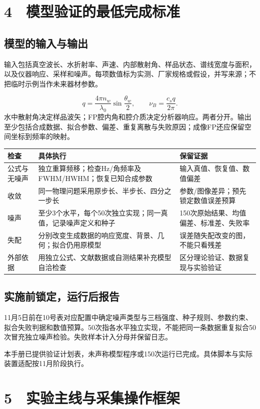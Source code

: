 \documentclass[UTF8,a4paper,11pt,fontset=fandol]{ctexart}
\begin{document}
\section*{4　模型验证的最低完成标准}
\subsection*{模型的输入与输出}
输入包括真空波长、水折射率、声速、内部散射角、样品状态、谱线宽度与面积，以及仪器响应、采样和噪声。每项数值标为实测、厂家规格或假设，并写来源；不把临时示例当作未来器材参数。

\begin{equation*}
q=\frac{4\pi n_w}{\lambda_0}\sin\frac{\theta_w}{2},\qquad
\nu_B=\frac{c_s q}{2\pi}.
\end{equation*}
水中散射角决定样品波矢；FP腔内角和腔介质决定分析器响应。两者分开。输出至少包括合成数据、拟合参数、偏差、重复离散与失败原因；成像FP还应保留空间坐标到频率的映射。

\begin{longtable}{P{2.0cm}P{7.3cm}P{4.8cm}}
\toprule
\textbf{检查} & \textbf{具体执行} & \textbf{保留证据}\\\midrule\endhead
公式与无噪声 & 独立重算频移；检查Hz/角频率及FWHM/HWHM；恢复已知合成参数 & 输入真值、恢复值、数值偏差\\[0.35em]
收敛 & 同一物理问题采用原步长、半步长、四分之一步长 & 参数/图像差异；预先锁定数值误差预算\\[0.35em]
噪声 & 至少3个水平，每个50次独立实现；同一真值，记录噪声定义和种子 & 150次原始结果、均值偏差、标准差、失败率\\[0.35em]
失配 & 分别改变生成数据的响应宽度、背景、几何；拟合仍用原模型 & 误差随失配改变的图，不能只看残差\\[0.35em]
外部依据 & 用独立公式、文献数据或自测结果补充模型自洽检查 & 区分理论验证、数据复现与实验验证\\[0.35em]
\bottomrule\end{longtable}
\subsection*{实施前锁定，运行后报告}
11月5日前在10号表对应配置中确定噪声类型与三档强度、种子规则、参数约束、拟合失败判据和数值预算。50次指各水平独立实现，不能把同一条数据重复拟合50次冒充独立噪声检验。失败样本计入分母并保留日志。

本手册已提供验证计划表，未声称模型程序或150次运行已完成。具体脚本与实际装置适配按11月阶段执行。

\clearpage
\section*{5　实验主线与采集操作框架}
\end{document}

